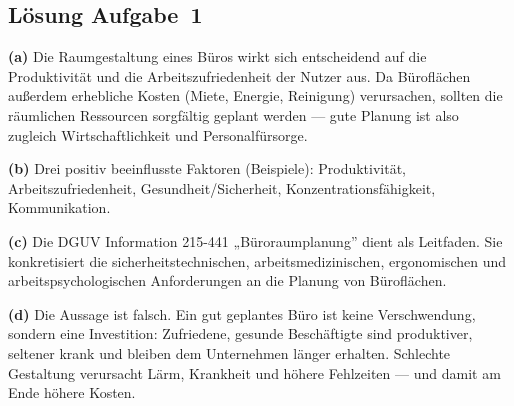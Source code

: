 \documentclass[11pt, a4paper]{article}
\begin{document}
\subsection*{Lösung Aufgabe~1}
\begin{loesung}
\textbf{(a)} Die Raumgestaltung eines Büros wirkt sich entscheidend auf die Produktivität
und die Arbeitszufriedenheit der Nutzer aus. Da Büroflächen außerdem erhebliche Kosten
(Miete, Energie, Reinigung) verursachen, sollten die räumlichen Ressourcen sorgfältig
geplant werden --- gute Planung ist also zugleich Wirtschaftlichkeit und Personalfürsorge.

\textbf{(b)} Drei positiv beeinflusste Faktoren (Beispiele): Produktivität,
Arbeitszufriedenheit, Gesundheit/Sicherheit, Konzentrationsfähigkeit, Kommunikation.

\textbf{(c)} Die DGUV Information 215-441 „Büroraumplanung” dient als Leitfaden. Sie
konkretisiert die sicherheits\-technischen, arbeitsmedizinischen, ergonomischen und
arbeits\-psychologischen Anforderungen an die Planung von Büroflächen.

\textbf{(d)} Die Aussage ist falsch. Ein gut geplantes Büro ist keine Verschwendung,
sondern eine Investition: Zufriedene, gesunde Beschäftigte sind produktiver, seltener
krank und bleiben dem Unternehmen länger erhalten. Schlechte Gestaltung verursacht
Lärm, Krankheit und höhere Fehlzeiten --- und damit am Ende höhere Kosten.
\end{loesung}
\end{document}

